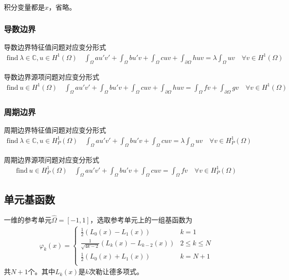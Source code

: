 \documentclass[12pt,a4paper]{article}
\begin{document}
积分变量都是$x$，省略。

\subsubsection{导数边界}

导数边界特征值问题对应变分形式
\begin{align*}
\text{find} \ \lambda \in \mathbb{C}, u \in H^1(\Omega) \quad \int_{\Omega} a u' v' + \int_{\Omega} b u' v + \int_{\Omega} c u v + \int_{\partial \Omega} h u v = \lambda \int_{\Omega} u v \quad \forall v \in H^1(\Omega)
\end{align*}

导数边界源项问题对应变分形式
\begin{align*}
\text{find} \ u \in H^1(\Omega) \quad \int_{\Omega} a u' v' + \int_{\Omega} b u' v + \int_{\Omega} c u v + \int_{\partial \Omega} h u v = \int_{\Omega} f v + \int_{\partial \Omega} g v \quad \forall v \in H^1(\Omega)
\end{align*}

\subsubsection{周期边界}

周期边界特征值问题对应变分形式
\begin{align*}
\text{find} \ \lambda \in \mathbb{C}, u \in H_{P}^1(\Omega) \quad \int_{\Omega} a u' v' + \int_{\Omega} b u' v + \int_{\Omega} c u v = \lambda \int_{\Omega} u v \quad \forall v \in H_{P}^1(\Omega)
\end{align*}

周期边界源项问题对应变分形式
\begin{align*}
\text{find} \ u \in H_{P}^1(\Omega) \quad \int_{\Omega} a u' v' + \int_{\Omega} b u' v + \int_{\Omega} c u v = \int_{\Omega} f v \quad \forall v \in H_{P}^1(\Omega)
\end{align*}


\subsection{单元基函数}

一维的参考单元$\hat{\Omega} = [-1,1]$，选取参考单元上的一组基函数为
\begin{align*}
\varphi_k(x) =
\left\{ \begin{array}{ll}
\frac{1}{2} (L_0(x) - L_1(x)) & k = 1 \\
\frac{1}{\sqrt{4k-2}} (L_{k}(x) - L_{k-2}(x)) & 2 \leq k \leq N \\
\frac{1}{2} (L_0(x) + L_1(x)) & k = N+1 \\
\end{array}  \right.
\end{align*}
共$N+1$个。其中$L_k(x)$是$k$次勒让德多项式。
\end{document}
